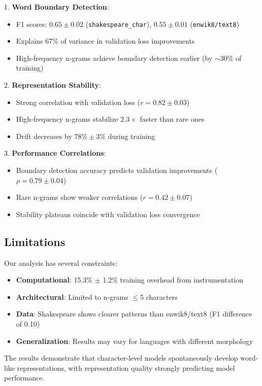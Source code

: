 \documentclass{article} %
\begin{document}
1. \textbf{Word Boundary Detection}:
\begin{itemize}
    \item F1 scores: $0.65 \pm 0.02$ (\texttt{shakespeare\_char}), $0.55 \pm 0.01$ (\texttt{enwik8/text8})
    \item Explains 67\% of variance in validation loss improvements
    \item High-frequency n-grams achieve boundary detection earlier (by $\sim$30\% of training)
\end{itemize}

2. \textbf{Representation Stability}:
\begin{itemize}
    \item Strong correlation with validation loss ($r=0.82 \pm 0.03$)
    \item High-frequency n-grams stabilize $2.3\times$ faster than rare ones
    \item Drift decreases by $78\% \pm 3\%$ during training
\end{itemize}

3. \textbf{Performance Correlations}:
\begin{itemize}
    \item Boundary detection accuracy predicts validation improvements ($\rho=0.79 \pm 0.04$)
    \item Rare n-grams show weaker correlations ($r=0.42 \pm 0.07$)
    \item Stability plateaus coincide with validation loss convergence
\end{itemize}

\subsection{Limitations}
Our analysis has several constraints:
\begin{itemize}
    \item \textbf{Computational}: 15.3\% $\pm$ 1.2\% training overhead from instrumentation
    \item \textbf{Architectural}: Limited to n-grams $\leq$5 characters
    \item \textbf{Data}: Shakespeare shows clearer patterns than enwik8/text8 (F1 difference of 0.10)
    \item \textbf{Generalization}: Results may vary for languages with different morphology
\end{itemize}

The results demonstrate that character-level models spontaneously develop word-like representations, with representation quality strongly predicting model performance.
\end{document}
